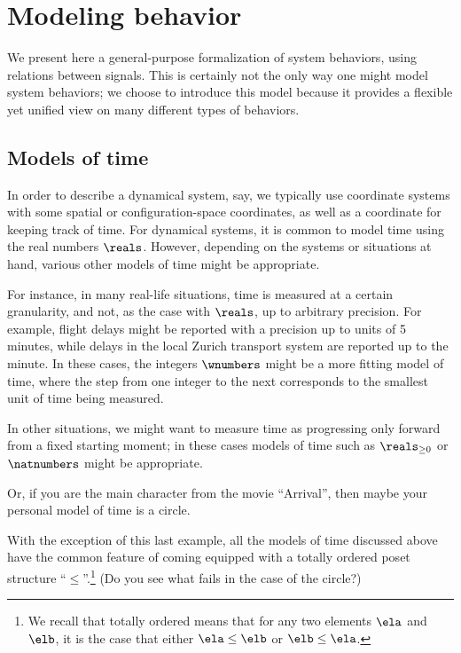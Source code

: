 
  \section{Modeling behavior}


    We present here a general-purpose formalization of system behaviors, using relations between signals. This is certainly not the only way one might model system behaviors; we choose to introduce this model because it provides a flexible yet unified view on many different types of behaviors.  
    
\subsection{Models of time}

In order to describe a dynamical system, say, we typically use coordinate systems with some spatial or configuration-space coordinates, as well as a coordinate for keeping track of time. For dynamical systems, it is common to model time using the real numbers $\reals$. However, depending on the systems or situations at hand, various other models of time might be appropriate. 

For instance, in many real-life situations, time is measured at a certain granularity, and not, as the case with $\reals$, up to arbitrary precision. For example, flight delays might be reported with a precision up to units of 5 minutes, while delays in the local Zurich transport system are reported up to the minute. In these cases, the integers $\wnumbers$ might be a more fitting model of time, where the step from one integer to the next corresponds to the smallest unit of time being measured. 

In other situations, we might want to measure time as progressing only forward from a fixed starting moment; in these cases models of time such as $\reals_{\geq 0}$ or $\natnumbers$ might be appropriate. 

Or, if you are the main character from the movie ``Arrival'', then maybe your personal model of time is a circle. 


With the exception of this last example, all the models of time discussed above have the common feature of coming equipped with a totally ordered poset structure ``$\leq$''.\footnote{We recall that totally ordered means that for any two elements $\ela$ and $\elb$, it is the case that either $\ela \leq \elb$ or $\elb \leq \ela$.}  (Do you see what fails in the case of the circle?) 



